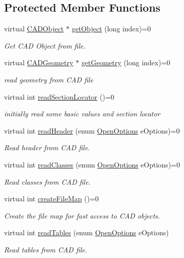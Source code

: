 \subsection*{Protected Member Functions}
\begin{DoxyCompactItemize}
\item 
virtual \hyperlink{class_c_a_d_object}{C\+A\+D\+Object} $\ast$ \hyperlink{class_c_a_d_file_aeb68cd431afb9c5657ae7cbe06deffc6}{get\+Object} (long index)=0
\begin{DoxyCompactList}\small\item\em Get C\+AD Object from file. \end{DoxyCompactList}\item 
virtual \hyperlink{class_c_a_d_geometry}{C\+A\+D\+Geometry} $\ast$ \hyperlink{class_c_a_d_file_a1c841beaf00d33fe888d5f750841829b}{get\+Geometry} (long index)=0
\begin{DoxyCompactList}\small\item\em read geometry from C\+AD file \end{DoxyCompactList}\item 
virtual int \hyperlink{class_c_a_d_file_a160199a6f2004ea5ed319639e2f1156e}{read\+Section\+Locator} ()=0
\begin{DoxyCompactList}\small\item\em initially read some basic values and section locator \end{DoxyCompactList}\item 
virtual int \hyperlink{class_c_a_d_file_a27a0eed4be75e5e1fcc9ca8ba9f881c8}{read\+Header} (enum \hyperlink{class_c_a_d_file_a4776c7f9fc5888cac0ee6eede900db5a}{Open\+Options} e\+Options)=0
\begin{DoxyCompactList}\small\item\em Read header from C\+AD file. \end{DoxyCompactList}\item 
virtual int \hyperlink{class_c_a_d_file_a3965f0e1668a25ce2ed06c9e8e1bffdd}{read\+Classes} (enum \hyperlink{class_c_a_d_file_a4776c7f9fc5888cac0ee6eede900db5a}{Open\+Options} e\+Options)=0
\begin{DoxyCompactList}\small\item\em Read classes from C\+AD file. \end{DoxyCompactList}\item 
virtual int \hyperlink{class_c_a_d_file_aac33914479442df31a4ab45df8e9e8a3}{create\+File\+Map} ()=0
\begin{DoxyCompactList}\small\item\em Create the file map for fast access to C\+AD objects. \end{DoxyCompactList}\item 
virtual int \hyperlink{class_c_a_d_file_a3e1d2a8827b5af6ba0ead4b746215eb7}{read\+Tables} (enum \hyperlink{class_c_a_d_file_a4776c7f9fc5888cac0ee6eede900db5a}{Open\+Options} e\+Options)
\begin{DoxyCompactList}\small\item\em Read tables from C\+AD file. \end{DoxyCompactList}\end{DoxyCompactItemize}
